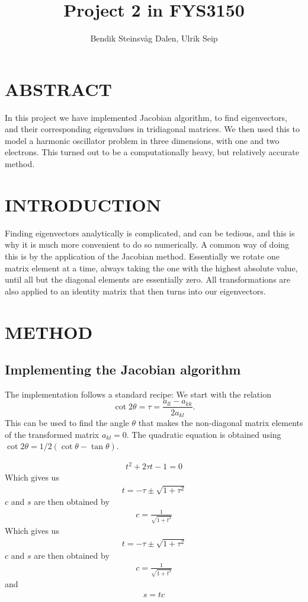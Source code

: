 \documentclass[a4paper]{article}
\title{Project 2 in FYS3150}
\author{Bendik Steinsvåg Dalen, Ulrik Seip}
\begin{document}
\maketitle

\section{ABSTRACT}

In this project we have implemented Jacobian algorithm, to find eigenvectors, and their corresponding eigenvalues in tridiagonal matrices. We then used this to model a harmonic oscillator problem in three dimensions, with one and two electrons. This turned out to be a computationally heavy, but relatively accurate method.

\section{INTRODUCTION}

Finding eigenvectors analytically is complicated, and can be tedious, and this is why it is much more convenient to do so numerically. A common way of doing this is by the application of the Jacobian method. Essentially we rotate one matrix element at a time, always taking the one with the highest absolute value, until all but the diagonal elements are essentially zero. All transformations are also applied to an identity matrix that then turns into our eigenvectors. 

\section{METHOD}

\subsection{Implementing the Jacobian algorithm}
The implementation follows a standard recipe:
We start with the relation
\begin{equation*}\cot 2\theta=\tau = \frac{a_{ll}-a_{kk}}{2a_{kl}}.
\end{equation*}
This can be used to find the angle $\theta$ that makes the  non-diagonal matrix elements of the transformed matrix 
$a_{kl} = 0$. The quadratic equation is obtained using $\cot 2\theta=1/2(\cot\theta-\tan\theta)$.

\begin{align}
t^2+2\tau t-1=0
\end{align}
Which gives us
\begin{align}
t = -\tau \pm \sqrt{1+\tau^2}
\end{align}
$c$ and $s$ are then obtained by
\begin{align}
c = \frac{1}{\sqrt{1+t^2}}
\end{align}
Which gives us
\begin{align}
t = -\tau \pm \sqrt{1+\tau^2}
\end{align}
$c$ and $s$ are then obtained by
\begin{align}
c = \frac{1}{\sqrt{1+t^2}}
\end{align}
and
\begin{align}
s=tc
\end{align}  
\end{document}

